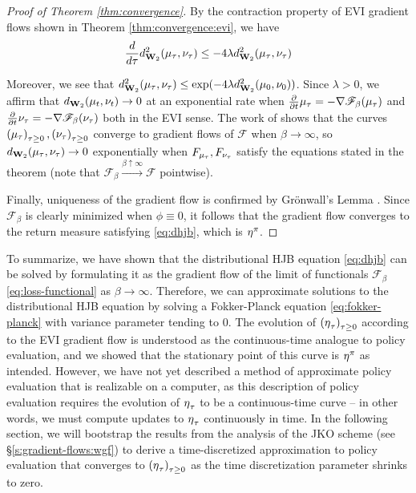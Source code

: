\begin{proof}[Proof of Theorem \ref{thm:convergence}]
  By the contraction property of EVI gradient flows shown in Theorem
  \ref{thm:convergence:evi}, we have
  \begin{align*}
    \frac{d}{d\tau}\wassermetric^2(\mu_\tau, \nu_\tau) &\leq
    -4\lambda\wassermetric^2(\mu_\tau, \nu_\tau)\\
  \end{align*}

  Moreover, we see that $\wassermetric^2(\mu_\tau, \nu_\tau) \leq
  \exp(-4\lambda\wassermetric^2(\mu_0, \nu_0))$. Since $\lambda>0$, we affirm
  that $\wassermetric(\mu_t, \nu_t)\to 0$ at an exponential rate when
  $\partialderiv{}{t}{\mu_\tau} = -\nabla\mathscr{F}_\beta(\mu_\tau)$
  and $\partialderiv{}{t}{\nu_\tau} = -\nabla\mathscr{F}_\beta(\nu_\tau)$ both in the
  EVI sense. The work of \citet{cuturi2013sinkhorn} shows that the curves
  $\indexedabove{\tau}{\mu},\indexedabove{\tau}{\nu}$ converge to gradient flows of
  $\mathscr{F}$ when $\beta\to\infty$, so $\wassermetric(\mu_\tau, \nu_\tau)\to 0$
  exponentially when $\cdf[\mu_\tau], \cdf[\nu_\tau]$ satisfy the equations
  stated in the theorem (note that
  $\mathscr{F}_\beta\overset{\beta\uparrow\infty}{\longrightarrow}\mathscr{F}$
  pointwise).

  Finally, uniqueness of the gradient flow is confirmed by Gr\"onwall's
  Lemma \citep{gronwall1919note}. Since $\mathscr{F}_\beta$ is clearly
  minimized when $\phi\equiv 0$, it follows that the gradient flow
  converges to the return measure satisfying \eqref{eq:dhjb}, which is
  $\returnmeasure^\pi$.
\end{proof}

To summarize, we have shown that the distributional HJB equation \eqref{eq:dhjb}
can be solved by formulating it as the gradient flow of the limit of functionals
$\mathscr{F}_\beta$ \eqref{eq:loss-functional} as $\beta\to\infty$. Therefore,
we can approximate solutions to the distributional HJB equation by solving a
Fokker-Planck equation \eqref{eq:fokker-planck} with variance parameter
tending to $0$. The evolution of $\indexedabove{\tau}{\returnmeasure}$ according to
the EVI gradient flow is understood as the continuous-time analogue to policy
evaluation, and we showed that the stationary point of this curve is
$\returnmeasure^\pi$ as intended. However, we have not yet described a method of
approximate policy evaluation that is realizable on a computer, as this
description of policy evaluation requires the evolution of $\returnmeasure_\tau$
to be a continuous-time curve -- in other words, we must compute updates to
$\returnmeasure_\tau$ continuously in time. In the following section, we will
bootstrap the results from the analysis of the JKO scheme (see
\S\ref{s:gradient-flows:wgf}) to derive a time-discretized approximation to
policy evaluation that converges to $\indexedabove{\tau}{\returnmeasure}$ as the
time discretization parameter shrinks to zero.

